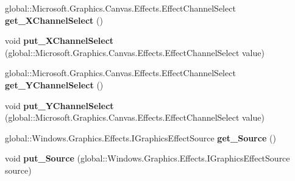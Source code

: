 \begin{DoxyCompactItemize}
\mbox{\label{interface_microsoft_1_1_graphics_1_1_canvas_1_1_effects_1_1_i_displacement_map_effect_aae337ddbef97551a32257022a3fa66a9}} 
global\+::\+Microsoft.\+Graphics.\+Canvas.\+Effects.\+Effect\+Channel\+Select {\bfseries get\+\_\+\+X\+Channel\+Select} ()
\item 
\mbox{\label{interface_microsoft_1_1_graphics_1_1_canvas_1_1_effects_1_1_i_displacement_map_effect_abe51385c67bec880ea3db9f871d8a0b1}} 
void {\bfseries put\+\_\+\+X\+Channel\+Select} (global\+::\+Microsoft.\+Graphics.\+Canvas.\+Effects.\+Effect\+Channel\+Select value)
\item 
\mbox{\label{interface_microsoft_1_1_graphics_1_1_canvas_1_1_effects_1_1_i_displacement_map_effect_afdb278b27ceb0bcc8d4f160ecadfb370}} 
global\+::\+Microsoft.\+Graphics.\+Canvas.\+Effects.\+Effect\+Channel\+Select {\bfseries get\+\_\+\+Y\+Channel\+Select} ()
\item 
\mbox{\label{interface_microsoft_1_1_graphics_1_1_canvas_1_1_effects_1_1_i_displacement_map_effect_a21fd084ca58eb6bb042e123fb75cf549}} 
void {\bfseries put\+\_\+\+Y\+Channel\+Select} (global\+::\+Microsoft.\+Graphics.\+Canvas.\+Effects.\+Effect\+Channel\+Select value)
\item 
\mbox{\label{interface_microsoft_1_1_graphics_1_1_canvas_1_1_effects_1_1_i_displacement_map_effect_a3ae94b5f7ba6e9a6577d1f8e64818dde}} 
global\+::\+Windows.\+Graphics.\+Effects.\+I\+Graphics\+Effect\+Source {\bfseries get\+\_\+\+Source} ()
\item 
\mbox{\label{interface_microsoft_1_1_graphics_1_1_canvas_1_1_effects_1_1_i_displacement_map_effect_a7510937c3744875c4cbbb6cb41254bd2}} 
void {\bfseries put\+\_\+\+Source} (global\+::\+Windows.\+Graphics.\+Effects.\+I\+Graphics\+Effect\+Source source)
\item 

\end{DoxyCompactItemize}
